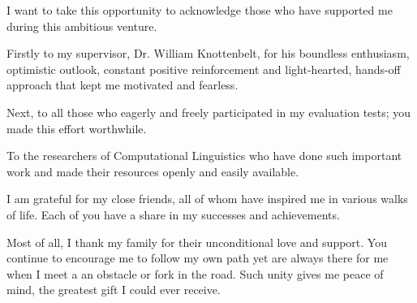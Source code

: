 

\begin{acknowledgements}      %

I want to take this opportunity to acknowledge those who have supported me during this ambitious venture.

Firstly to my supervisor, Dr. William Knottenbelt, for his boundless enthusiasm, optimistic outlook, constant positive reinforcement and light-hearted, hands-off approach that kept me motivated and fearless.

Next, to all those who eagerly and freely participated in my evaluation tests; you made this effort worthwhile.

To the researchers of Computational Linguistics who have done such important work and made their resources openly and easily available.

I am grateful for my close friends, all of whom have inspired me in various walks of life. Each of you have a share in my successes and achievements.

Most of all, I thank my family for their unconditional love and support. You continue to encourage me to follow my own path yet are always there for me when I meet a an obstacle or fork in the road. Such unity gives me peace of mind, the greatest gift I could ever receive.

\end{acknowledgements}


